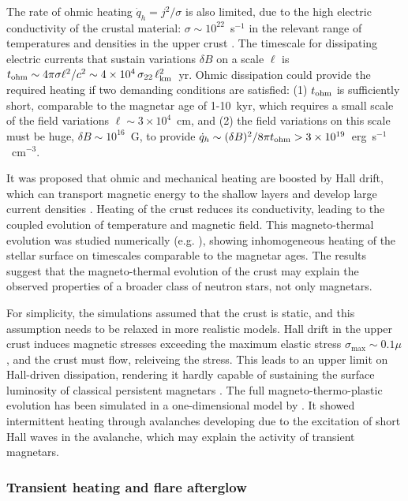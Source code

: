 The rate of ohmic heating $\dot{q}_h=j^2/\sigma$ is also limited, due to the 
high electric conductivity of the crustal material: $\sigma\sim 10^{22}$~s$^{-1}$ 
in the relevant range of temperatures and densities in the upper crust \citep{ppp15}. 
The timescale for dissipating electric currents that sustain variations $\delta B$
on a scale $\ell$ is 
$t_{\rm ohm}\sim 4\pi\sigma \ell^2/c^2\sim 4\times 10^4\, \sigma_{22}\,\ell_{\rm km}^2$~yr.
Ohmic dissipation could provide the required heating if two demanding conditions 
are satisfied:
(1) $t_{\rm ohm}$ is sufficiently short, comparable to the magnetar age of 1-10~kyr,
which requires a small scale of the field variations $\ell\sim 3\times 10^4$~cm, and
(2) the field variations on this scale must be huge, $\delta B \sim 10^{16}$~G, to provide 
$\dot{q}_h\sim (\delta B)^2/8\pi t_{\rm ohm}>3\times 10^{19}$~erg~s$^{-1}$~cm$^{-3}$.

It was proposed that ohmic and mechanical heating are boosted by Hall drift, which can 
transport magnetic energy to the shallow layers \citep{jon88} and develop 
large current densities \citep{gr92}.
Heating of the crust reduces its conductivity, leading to the coupled evolution of 
temperature and magnetic field. This magneto-thermal evolution was studied numerically
(e.g. \citealt{pmg09,vrp+13}), showing inhomogeneous 
heating of the stellar surface on timescales comparable to the magnetar ages.
The results suggest that the magneto-thermal evolution of the crust may explain 
the observed properties of a broader class of neutron stars, not only magnetars.

For simplicity, the simulations assumed that the crust is static, and this assumption 
needs to be relaxed in more realistic models.
Hall drift in the upper crust induces magnetic stresses exceeding 
the maximum elastic stress $\sigma_{\max}\sim 0.1\mu$, and the crust must flow, 
releiveing the stress. This leads to an upper limit on Hall-driven dissipation,
rendering it hardly capable of sustaining the surface luminosity of classical 
persistent magnetars \citep{bl16}. 
The full magneto-thermo-plastic evolution has been simulated in a one-dimensional 
model by \citet{llb16}. It showed intermittent heating 
through avalanches developing due to the excitation of short Hall waves in the avalanche,
which may explain the activity of transient magnetars.


\subsubsection{Transient heating and flare afterglow}


